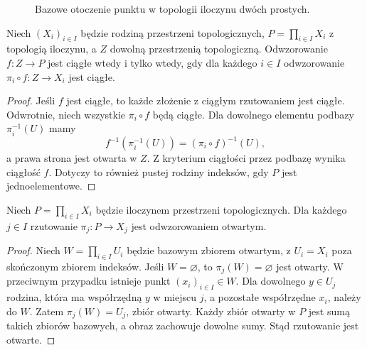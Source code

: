 \begin{figure}[htbp]
\centering
{}
\caption{Bazowe otoczenie punktu w topologii iloczynu dwóch prostych.}
\label{fig:topog-iloczyn-prostokat}
\end{figure}

\begin{twierdzenie}
\label{thm:topog-iloczyn-uniwersalnosc}
Niech $(X_i)_{i\in I}$ będzie rodziną przestrzeni
topologicznych, $P=\prod_{i\in I}X_i$ z topologią
iloczynu, a $Z$ dowolną przestrzenią topologiczną.
Odwzorowanie $f\colon Z\to P$ jest ciągłe wtedy i tylko
wtedy, gdy dla każdego $i\in I$ odwzorowanie
$\pi_i\circ f\colon Z\to X_i$ jest ciągłe.
\end{twierdzenie}
\begin{proof}
Jeśli $f$ jest ciągłe, to każde złożenie z ciągłym
rzutowaniem jest ciągłe. Odwrotnie, niech wszystkie
$\pi_i\circ f$ będą ciągłe. Dla dowolnego elementu
podbazy $\pi_i^{-1}(U)$ mamy
\[
f^{-1}(\pi_i^{-1}(U))=(\pi_i\circ f)^{-1}(U),
\]
a prawa strona jest otwarta w $Z$. Z kryterium ciągłości
przez podbazę wynika ciągłość $f$. Dotyczy to również
pustej rodziny indeksów, gdy $P$ jest jednoelementowe.
\end{proof}

\begin{stwierdzenie}
\label{prop:topog-rzutowania-otwarte}
Niech $P=\prod_{i\in I}X_i$ będzie iloczynem przestrzeni
topologicznych. Dla każdego $j\in I$ rzutowanie
$\pi_j\colon P\to X_j$ jest odwzorowaniem otwartym.
\end{stwierdzenie}
\begin{proof}
Niech $W=\prod_{i\in I}U_i$ będzie bazowym zbiorem
otwartym, z $U_i=X_i$ poza skończonym zbiorem indeksów.
Jeśli $W=\varnothing$, to $\pi_j(W)=\varnothing$ jest
otwarty. W przeciwnym przypadku istnieje punkt
$(x_i)_{i\in I}\in W$. Dla dowolnego $y\in U_j$
rodzina, która ma współrzędną $y$ w miejscu $j$, a
pozostałe współrzędne $x_i$, należy do $W$. Zatem
$\pi_j(W)=U_j$, zbiór otwarty. Każdy zbiór otwarty
w $P$ jest sumą takich zbiorów bazowych, a obraz
zachowuje dowolne sumy. Stąd rzutowanie jest otwarte.
\end{proof}

